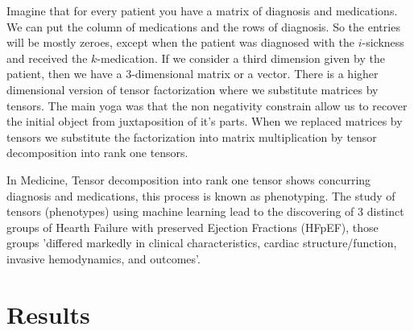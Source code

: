 \documentclass[11pt,letterpaper]{report}
\begin{document}
 

Imagine that for every patient you have a matrix of diagnosis and medications. We can put the column of medications and the rows of diagnosis. So the entries will be mostly zeroes, except when the patient was diagnosed with the $i$-sickness and received the $k$-medication. If we consider a third dimension given by the patient, then we have a 3-dimensional matrix or a vector.
 There is a higher dimensional version of tensor factorization  where we substitute  matrices by tensors. 
 The main yoga was that the non negativity constrain allow us to recover the initial object from juxtaposition of it's parts. 
 When we  replaced matrices by tensors we substitute the factorization into matrix multiplication by tensor decomposition into rank one tensors. 
 
 
In Medicine, Tensor decomposition into rank one tensor shows concurring diagnosis and medications, this process is known as phenotyping.  The study of tensors (phenotypes) using machine learning lead to the discovering of 3 distinct groups of Hearth Failure with preserved Ejection Fractions (HFpEF), those groups 'differed markedly in clinical characteristics, cardiac structure/function, invasive hemodynamics, and outcomes'.
 
 

			
		
		

	
	
	
	
	
	\chapter{Results}
	
\end{document}
